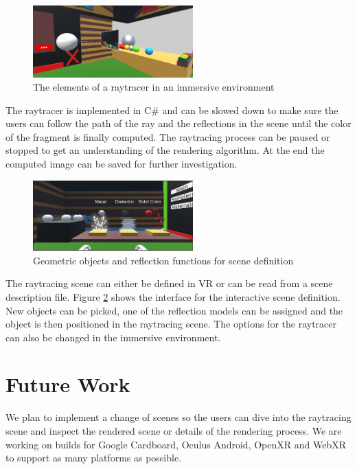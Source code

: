\documentclass{VRARWorkshop}
\begin{document}
\begin{figure}[h!]
    \begin{center}
        \includegraphics[width=0.55\textwidth]{duringProcess}
        \caption{\label{vray:scene} The elements of a raytracer in an immersive environment}
    \end{center}
\end{figure}
The raytracer is implemented in C\# and can be slowed down to make sure the users can follow the path
of the ray and the reflections in the scene until the color of the fragment is finally computed.
The raytracing process can be paused or stopped to get an understanding of the rendering algorithm.
At the end the computed image can be saved for further investigation.

\begin{figure}[h!]
    \begin{center}
        \includegraphics[width=0.55\textwidth]{sphereCreating}
        \caption{\label{vray:materials} Geometric objects and reflection functions for scene definition}
    \end{center}
\end{figure}
The raytracing scene can either be defined in VR or can be read from a scene description file.
Figure \ref{vray:materials} shows the interface for the interactive scene definition.
New objects can be picked, one of the reflection models can be assigned and the object
is then positioned in the raytracing scene.
The options for the raytracer can also be changed in the immersive environment.
%
\section{Future Work}
We plan to implement a change of scenes so the users can dive into the raytracing scene
and inspect the rendered scene or details of the rendering process.
We are working on builds for Google Cardboard, Oculus Android,
OpenXR and WebXR to support as many platforms as possible.
\end{document}
